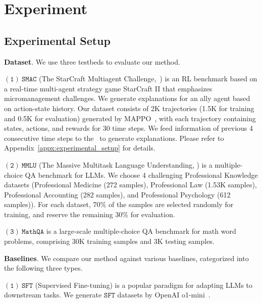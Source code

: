 \section{Experiment}

\subsection{Experimental Setup}
\textbf{Dataset}. We use three testbeds to evaluate our method. 

$\mathtt{(1)\ SMAC}$ (The 
StarCraft Multiagent Challenge,~\citet{samvelyan2019starcraft}) is an RL benchmark based on a real-time multi-agent strategy game StarCraft II that emphasizes micromanagement challenges. We generate explanations for an ally agent based on action-state history. Our dataset consists of 2K trajectories (1.5K for training and 0.5K for evaluation) generated by MAPPO~\cite{yu2022surprising}, with each trajectory containing states, actions, and rewards for 30 time steps. We feed information of previous 4 consecutive time steps to the \elm~to generate explanations. Please refer to Appendix~\ref{appx:experimental_setup} for details.

$\mathtt{(2)\ MMLU}$ (The Massive Multitask Language Understanding, \citet{hendrycks2020measuring}) is a multiple-choice QA benchmark for LLMs. We choose 4 challenging Professional Knowledge datasets (Professional Medicine (272 samples), Professional Law (1.53K samples), Professional Accounting (282 samples), and Professional Psychology (612 samples)). For each dataset, 70\% of the samples are selected randomly for training, and reserve the remaining 30\% for evaluation.

$\mathtt{(3)\ MathQA}$ \cite{amini2019mathqa} is a large-scale multiple-choice QA benchmark for math word problems, comprising 30K training samples and 3K testing samples.



\textbf{Baselines}.
We compare our method against various baselines, categorized into the following three types. 

$\mathtt{(1)\ SFT}$ (Supervised Fine-tuning) is a popular paradigm for adapting LLMs to downstream tasks. We generate ${\mathtt{SFT}}$ datasets by OpenAI o1-mini~\cite{jaech2024openai}.

